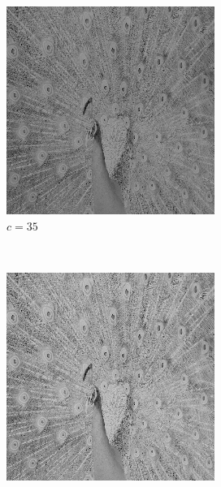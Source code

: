 \documentclass{article}
\begin{document}
\begin{enumerate}[label=(\alph*)]
\begin{figure}[!htb]
        \begin{subfigure}[b]{0.3\textwidth}
            \includegraphics[width=\textwidth]{img/LT35.png}
            \caption{$c = 35$}
        \end{subfigure}
        ~
        \begin{subfigure}[b]{0.3\textwidth}
            \includegraphics[width=\textwidth]{img/LT45.png}

\end{subfigure}
\end{figure}
\end{enumerate}
\end{document}
